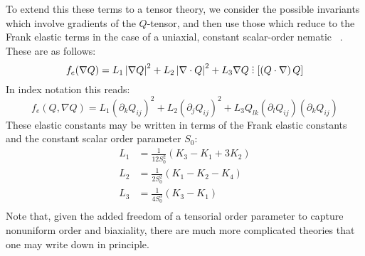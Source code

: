 \documentclass[reqno]{article}
\DeclareRobustCommand{\divby}{%
  \mathrel{\vbox{\baselineskip.65ex\lineskiplimit0pt\hbox{.}\hbox{.}\hbox{.}}}%
}
\begin{document}
  To extend this these terms to a tensor theory, we consider the possible
  invariants which involve gradients of the $Q$-tensor, and then use those which
  reduce to the Frank elastic terms in the case of a uniaxial, constant
  scalar-order nematic ~\cite{mottram_introduction_2014}.
  These are as follows:
  \begin{equation} \label{eq:elastic-free-energy}
    f_e (\nabla Q)
    = L_1 \left| \nabla Q \right|^2
    + L_2 \left| \nabla \cdot Q \right|^2
    + L_3 \nabla Q  \divby \left[ \left( Q \cdot \nabla \right) Q \right]
  \end{equation}
  In index notation this reads:
  \begin{equation}
    f_e (Q, \nabla Q)
    =
    L_1 \left( \partial_k Q_{ij} \right)^2
    + L_2 \left( \partial_j Q_{ij} \right)^2
    + L_3 Q_{lk} \left( \partial_{l} Q_{ij} \right) \left( \partial_k Q_{ij} \right)
  \end{equation}
  These elastic constants may be written in terms of the Frank elastic constants
  and the constant scalar order parameter $S_0$:
  \begin{equation} \label{eq:elastic-constants-mapping}
    \begin{split}
      L_1 &= \frac{1}{12 S_0^2} (K_3 - K_1 + 3 K_2) \\
      L_2 &= \frac{1}{2 S_0^2} (K_1 - K_2 - K_4) \\
      L_3 &= \frac{1}{4 S_0^3} (K_3 - K_1) \\
    \end{split}
  \end{equation}
  Note that, given the added freedom of a tensorial order parameter to capture
  nonuniform order and biaxiality, there are much more complicated theories that
  one may write down in principle.
  
\end{document}
